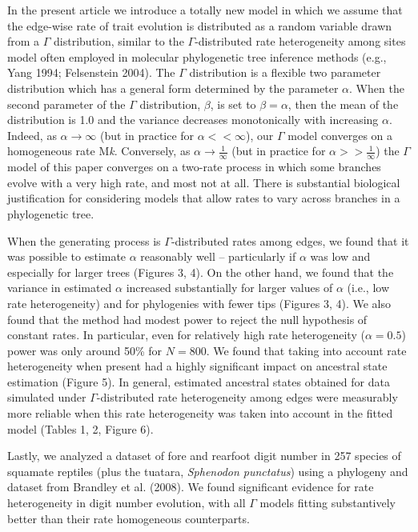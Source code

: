 \documentclass[fleqn,10pt,lineno]{wlpeerj} %
\begin{document}
In the present article we introduce a totally new model in which we assume that the edge-wise rate of trait evolution is distributed as a random variable drawn from a \(\Gamma\) distribution, similar to the \(\Gamma\)-distributed rate heterogeneity among sites model often employed in molecular phylogenetic tree inference methods (e.g., Yang 1994; Felsenstein 2004). The \(\Gamma\) distribution is a flexible two parameter distribution which has a general form determined by the parameter \(\alpha\). When the second parameter of the \(\Gamma\) distribution, \(\beta\), is set to \(\beta = \alpha\), then the mean of the distribution is 1.0 and the variance decreases monotonically with increasing \(\alpha\). Indeed, as \(\alpha \rightarrow \infty\) (but in practice for \(\alpha << \infty\)), our \(\Gamma\) model converges on a homogeneous rate M\emph{k}. Conversely, as \(\alpha \rightarrow \frac{1}\infty\) (but in practice for \(\alpha >> \frac{1}\infty\)) the \(\Gamma\) model of this paper converges on a two-rate process in which some branches evolve with a very high rate, and most not at all. There is substantial biological justification for considering models that allow rates to vary across branches in a phylogenetic tree.

When the generating process is \(\Gamma\)-distributed rates among edges, we found that it was possible to estimate \(\alpha\) reasonably well -- particularly if \(\alpha\) was low and especially for larger trees (Figures 3, 4). On the other hand, we found that the variance in estimated \(\alpha\) increased substantially for larger values of \(\alpha\) (i.e., low rate heterogeneity) and for phylogenies with fewer tips (Figures 3, 4). We also found that the method had modest power to reject the null hypothesis of constant rates. In particular, even for relatively high rate heterogeneity (\(\alpha = 0.5\)) power was only around 50\% for \(N = 800\). We found that taking into account rate heterogeneity when present had a highly significant impact on ancestral state estimation (Figure 5). In general, estimated ancestral states obtained for data simulated under \(\Gamma\)-distributed rate heterogeneity among edges were measurably more reliable when this rate heterogeneity was taken into account in the fitted model (Tables 1, 2, Figure 6).

Lastly, we analyzed a dataset of fore and rearfoot digit number in 257 species of squamate reptiles (plus the tuatara, \emph{Sphenodon punctatus}) using a phylogeny and dataset from Brandley et al. (2008). We found significant evidence for rate heterogeneity in digit number evolution, with all \(\Gamma\) models fitting substantively better than their rate homogeneous counterparts.
\end{document}
